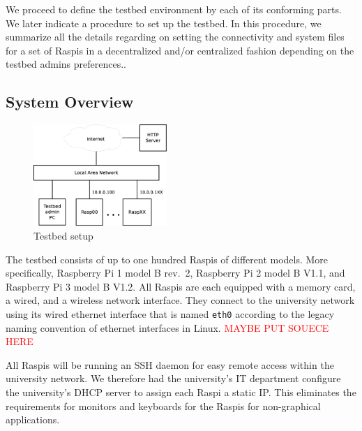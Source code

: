 \label{sec:testbed}

We proceed to define the testbed environment by each of its conforming
parts. We later indicate a procedure to set up the testbed. In this procedure,
we summarize all the details regarding on setting the connectivity and
system files for a set of \ac{Raspi}s in a decentralized and/or centralized fashion
depending on the testbed admins preferences..

\subsection{System Overview}


\begin{figure}[ht!]
\centering
\includegraphics[width=0.45\textwidth]{images/testbed_setup3.eps}
\caption{Testbed setup}
\label{fig:testbed_setup}
\end{figure}

The testbed consists of up to one hundred \ac{Raspi}s of different models.
More specifically, Raspberry Pi 1 model B rev.~2,
Raspberry Pi 2 model B V1.1, and Raspberry Pi 3 model B V1.2.
All \ac{Raspi}s are each equipped with a memory card, a wired, and a wireless
network interface. They connect to the university network using its wired
ethernet interface that is named \texttt{eth0} according to the legacy naming
convention of ethernet interfaces in Linux. \textcolor{red}{MAYBE PUT SOUECE HERE}

All \ac{Raspi}s will be running an \ac{SSH} daemon for easy remote access
within the university network. We therefore had the university's \ac{IT}
department configure the university's \ac{DHCP} server to assign each \ac{Raspi} a
static \ac{IP}. This eliminates the requirements for monitors and keyboards
for the \ac{Raspi}s for non-graphical applications.

